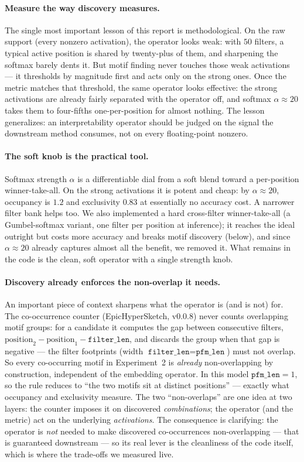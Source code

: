 \paragraph{Measure the way discovery measures.} The single most important lesson of this report
is methodological. On the raw support (every nonzero activation), the operator looks weak: with
$50$ filters, a typical active position is shared by twenty-plus of them, and sharpening the
softmax barely dents it. But motif finding never touches those weak activations --- it thresholds
by magnitude first and acts only on the strong ones. Once the metric matches that threshold, the
same operator looks effective: the strong activations are already fairly separated with the
operator off, and softmax $\alpha\approx20$ takes them to four-fifths one-per-position for almost
nothing. The lesson generalizes: an interpretability operator should be judged on the signal the
downstream method consumes, not on every floating-point nonzero.

\paragraph{The soft knob is the practical tool.} Softmax strength $\alpha$ is a differentiable dial
from a soft blend toward a per-position winner-take-all. On the strong activations it is potent and
cheap: by $\alpha\approx20$, occupancy is $1.2$ and exclusivity $0.83$ at essentially no accuracy
cost. A narrower filter bank helps too. We also implemented a hard cross-filter winner-take-all
(a Gumbel-softmax variant, one filter per position at inference); it reaches the ideal outright but
costs more accuracy and breaks motif discovery (below), and since $\alpha\approx20$ already captures
almost all the benefit, we removed it. What remains in the code is the clean, soft operator with a
single strength knob.

\paragraph{Discovery already enforces the non-overlap it needs.} An important piece of context
sharpens what the operator is (and is not) for. The co-occurrence counter (EpicHyperSketch,
v0.0.8) never counts overlapping motif groups: for a candidate it computes the gap between
consecutive filters, $\text{position}_2 - \text{position}_1 - \texttt{filter\_len}$, and discards
the group when that gap is negative --- the filter footprints (width
$\texttt{filter\_len}=\texttt{pfm\_len}$) must not overlap. So every co-occurring motif in
Experiment~2 is \emph{already} non-overlapping by construction, independent of the embedding
operator. In this model $\texttt{pfm\_len}=1$, so the rule reduces to ``the two motifs sit at
distinct positions'' --- exactly what occupancy and exclusivity measure. The two ``non-overlaps''
are one idea at two layers: the counter imposes it on discovered \emph{combinations}; the operator
(and the metric) act on the underlying \emph{activations}. The consequence is clarifying: the
operator is \emph{not} needed to make discovered co-occurrences non-overlapping --- that is
guaranteed downstream --- so its real lever is the cleanliness of the code itself, which is where
the trade-offs we measured live.

